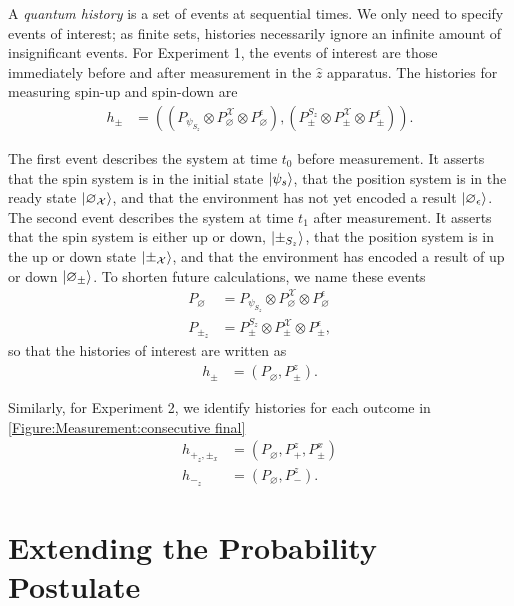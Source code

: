 A \textit{quantum history} is a set of events at sequential times. We only need to specify events of interest; as finite sets, histories necessarily ignore an infinite amount of insignificant events. For Experiment 1, the events of interest are those immediately before and after measurement in the $\hat{z}$ apparatus. The histories for measuring spin-up and spin-down are
\begin{align}
  h_\pm &= \left( \left(P_{\psi_{S_z}} \otimes P^\mathcal{X}_\varnothing \otimes P^\epsilon_\varnothing \right), \left(P^{S_z}_\pm \otimes P^\mathcal{X}_\pm \otimes P^\epsilon_\pm \right)  \right).
\end{align}

The first event describes the system at time $t_0$ before measurement. It asserts that the spin system is in the initial state $\ket{\psi_s}$, that the position system is in the ready state ${\ket{\varnothing_\mathcal{X}}}$, and that the environment has not yet encoded a result $\ket{\varnothing_\epsilon}$. The second event describes the system at time $t_1$ after measurement. It asserts that the spin system is either up or down, $\ket{\pm_{S_z}}$, that the position system is in the up or down state ${\ket{\pm_\mathcal{X}}}$, and that the environment has encoded a result of up or down $\ket{\varnothing_\pm}$.  To shorten future calculations, we name these events
\begin{align}
  P_\varnothing &= P_{\psi_{S_z}} \otimes P^\mathcal{X}_\varnothing \otimes P^\epsilon_\varnothing  \\ \nonumber
  P_{\pm_z} &= P^{S_z}_\pm \otimes P^\mathcal{X}_\pm \otimes P^\epsilon_\pm,
\end{align}
so that the histories of interest are written as
\begin{align}
  h_\pm &= \left(P_\varnothing, P^z_{\pm} \right).
\end{align}

Similarly, for Experiment 2, we identify histories for each outcome in \autoref{Figure:Measurement:consecutive final}
\begin{align} \label{eq:Experiment 2 Histories}
  h_{+_z, \pm_x} &= \left(P_\varnothing, P^z_+, P^x_\pm \right) \\ \nonumber
  h_{-_z} &= \left(P_\varnothing, P^z_-\right).
\end{align}

\section{Extending the Probability Postulate}


